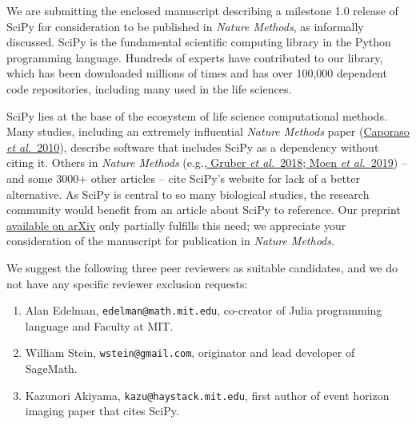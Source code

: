 \documentclass[10pt,stdletter,dateno]{newlfm}
\begin{document}
\begin{newlfm}

We are submitting the enclosed manuscript describing a milestone
1.0 release of SciPy for consideration to be published in
\emph{Nature Methods}, as informally discussed.
SciPy is the fundamental scientific 
computing library in the Python programming language. 
Hundreds of experts have contributed to our library, which
has been downloaded millions of times and has over 100,000 dependent
code repositories, including many used in the life sciences.

SciPy lies at the base of the ecosystem of life science computational
methods. Many studies, including an extremely influential \emph{Nature 
Methods} paper (\href{https://www.nature.com/articles/nmeth.f.303}
{Caporaso \emph{et al.}~2010}), describe software that 
includes SciPy as a dependency without citing it. Others in \emph{
Nature Methods} (e.g.,\href{https://www.nature.com/articles/s41592-018-0114-z}{
Gruber \emph{et al.}~2018};\href{https://www.nature.com/articles/s41592-019-0403-1}{
Moen \emph{et al.}~2019}) -- and some 3000+ other articles -- 
cite SciPy's website for lack of
a better alternative. As SciPy is central to so many biological studies,
the research community would benefit from an article about SciPy to reference.
Our preprint \href{https://arxiv.org/abs/1907.10121}{available on arXiv} 
only partially fulfills this need; we appreciate your consideration of
the manuscript for publication in \emph{Nature Methods}.

We suggest the following three peer reviewers as suitable candidates,
and we do not have any specific reviewer exclusion requests:

\begin{enumerate}
    \item Alan Edelman, \texttt{edelman@math.mit.edu}, co-creator of Julia
    programming language and Faculty at MIT.
    \item William Stein, \texttt{wstein@gmail.com}, originator and
    lead developer of SageMath.
    \item Kazunori Akiyama, \texttt{kazu@haystack.mit.edu}, first author
    of event horizon imaging paper that cites SciPy.
\end{enumerate}

\end{newlfm}
\end{document}
